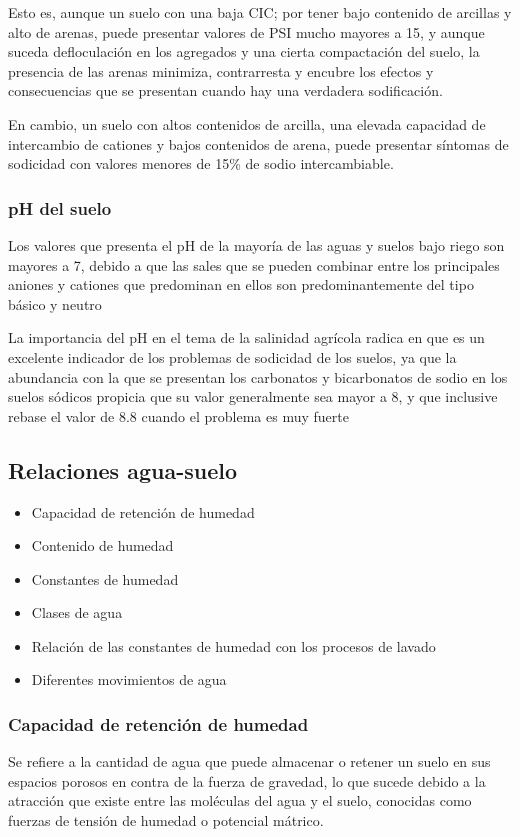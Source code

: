 Esto es, aunque un suelo con una baja CIC; por tener bajo contenido de arcillas y alto de arenas, puede presentar valores de PSI mucho mayores a 15, y aunque suceda defloculación en los agregados y una cierta compactación del suelo, la presencia de las arenas minimiza, contrarresta y encubre los efectos y consecuencias que se presentan cuando hay una verdadera sodificación.

En cambio, un suelo con altos contenidos de arcilla, una elevada capacidad de intercambio de cationes y bajos contenidos de arena, puede presentar síntomas de sodicidad con valores menores de 15\% de sodio intercambiable.

\subsubsection{pH del suelo}
Los valores que presenta el pH de la mayoría de las aguas y suelos bajo riego son mayores a 7, debido a que las sales que se pueden combinar entre los principales aniones y cationes que predominan en ellos son predominantemente del tipo básico y neutro

La importancia del pH en el tema de la salinidad agrícola radica en que es un excelente indicador de los problemas de sodicidad de los suelos, ya que la abundancia con la que se presentan los carbonatos y bicarbonatos de sodio en los suelos sódicos propicia que su valor generalmente sea mayor a 8, y que inclusive rebase el valor de 8.8 cuando el problema es muy fuerte

\subsection{Relaciones agua-suelo}
\begin{itemize}
\item Capacidad de retención de humedad
\item Contenido de humedad
\item Constantes de humedad
\item Clases de agua
\item Relación de las constantes de humedad con los procesos de lavado
\item Diferentes movimientos de agua
\end{itemize}
\subsubsection{Capacidad de retención de humedad}
Se refiere a la cantidad de agua que puede almacenar o retener un suelo en sus espacios porosos en contra de la fuerza de gravedad, lo que sucede debido a la atracción que existe entre las moléculas del agua y el suelo, conocidas como fuerzas de tensión de humedad o potencial mátrico.

